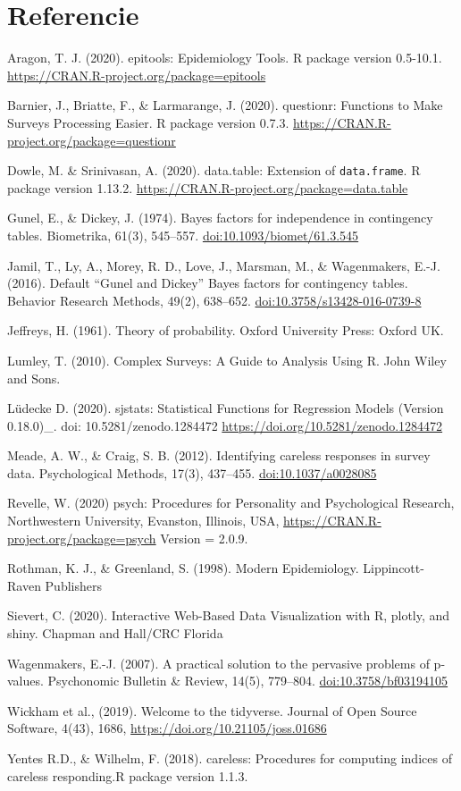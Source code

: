 \documentclass[
]{article}
\begin{document}
\hypertarget{referencie}{%
\section{Referencie}\label{referencie}}

Aragon, T. J. (2020). epitools: Epidemiology Tools. R package version 0.5-10.1.
\url{https://CRAN.R-project.org/package=epitools}

Barnier, J., Briatte, F., \& Larmarange, J. (2020). questionr: Functions to Make Surveys Processing Easier. R package version 0.7.3. \url{https://CRAN.R-project.org/package=questionr}

Dowle, M. \& Srinivasan, A. (2020). data.table: Extension of \texttt{data.frame}. R package version 1.13.2. \url{https://CRAN.R-project.org/package=data.table}

Gunel, E., \& Dickey, J. (1974). Bayes factors for independence in contingency tables. Biometrika, 61(3), 545--557. \url{doi:10.1093/biomet/61.3.545}

Jamil, T., Ly, A., Morey, R. D., Love, J., Marsman, M., \& Wagenmakers, E.-J. (2016). Default ``Gunel and Dickey'' Bayes factors for contingency tables. Behavior Research Methods, 49(2), 638--652. \url{doi:10.3758/s13428-016-0739-8}

Jeffreys, H. (1961). Theory of probability. Oxford University Press: Oxford UK.

Lumley, T. (2010). Complex Surveys: A Guide to Analysis Using R. John Wiley and Sons.

Lüdecke D. (2020). sjstats: Statistical Functions for Regression Models (Version
0.18.0)\_. doi: 10.5281/zenodo.1284472 \url{https://doi.org/10.5281/zenodo.1284472}

Meade, A. W., \& Craig, S. B. (2012). Identifying careless responses in survey data. Psychological Methods, 17(3), 437--455. \url{doi:10.1037/a0028085}

Revelle, W. (2020) psych: Procedures for Personality and Psychological Research, Northwestern University, Evanston, Illinois, USA, \url{https://CRAN.R-project.org/package=psych} Version = 2.0.9.

Rothman, K. J., \& Greenland, S. (1998). Modern Epidemiology. Lippincott-Raven Publishers

Sievert, C. (2020). Interactive Web-Based Data Visualization with R, plotly, and shiny. Chapman and Hall/CRC Florida

Wagenmakers, E.-J. (2007). A practical solution to the pervasive problems of p-values. Psychonomic Bulletin \& Review, 14(5), 779--804. \url{doi:10.3758/bf03194105}

Wickham et al., (2019). Welcome to the tidyverse. Journal of Open Source Software, 4(43), 1686, \url{https://doi.org/10.21105/joss.01686}

Yentes R.D., \& Wilhelm, F. (2018). careless: Procedures for computing indices of careless responding.R package version 1.1.3.
\end{document}
